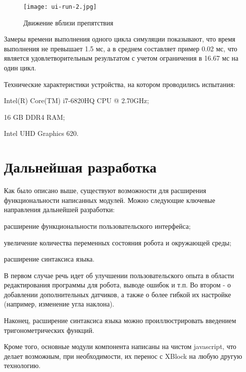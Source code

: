 \begin{figure}[htbp]
	\centering
	\texttt{[image: ui-run-2.jpg]}
	\caption{Движение вблизи препятствия}%
	\label{fig:ui-run-2}
\end{figure}

Замеры времени выполнения одного цикла симуляции показывают, что время выполнения не превышает 1.5 мс, а в среднем составляет пример 0.02 мс, что является удовлетворительным результатом с учетом ограничения в 16.67 мс на один цикл. 

Технические характеристики устройства, на котором проводились испытания:

\begin{itemize*}
	\item Intel(R) Core(TM) i7-6820HQ CPU @ 2.70GHz;
	\item 16 GB DDR4 RAM;
	\item Intel UHD Graphics 620.
\end{itemize*}

\section{Дальнейшая разработка}

Как было описано выше, существуют возможности для расширения функциональности написанных модулей. Можно следующие ключевые направления дальнейшей разработки:

\begin{itemize*}
	\item расширение функциональности пользовательского интерфейса;
	\item увеличение количества переменных состояния робота и окружающей среды;
	\item расширение синтаксиса языка.
\end{itemize*}

В первом случае речь идет об улучшении пользовательского опыта в области редактирования программы для робота, выводе ошибок и т.п. Во втором - о добавлении дополнительных датчиков, а также о более гибкой их настройке (например, изменение угла наклона).

Наконец, расширение синтаксиса языка можно проиллюстрировать введением тригонометрических функций.

Кроме того, основные модули компонента написаны на чистом javascript, что делает возможным, при необходимости, их перенос с XBlock на любую другую технологию.


